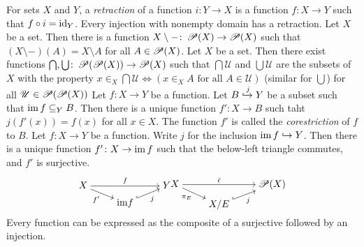  For sets $X$ and $Y$, a \textit{retraction} of a function $i \colon Y \to X$ is a function $f \colon X \to Y$ such that $f \circ i = \operatorname{id}_Y$.
 Every injection with nonempty domain has a retraction.
 Let $X$ be a set. Then there is a function $X \setminus - \colon \operatorname{\mathscr{P}}(X) \to \operatorname{\mathscr{P}}(X)$ such that $(X \setminus -) (A) = X \setminus A$ for all $A \in \operatorname{\mathscr{P}}(X)$.
 Let $X$ be a set. Then there exist functions $\bigcap, \bigcup \colon \operatorname{\mathscr{P}}(\operatorname{\mathscr{P}}(X)) \to \operatorname{\mathscr{P}}(X)$ such that $\bigcap \mathscr{U}$ and $\bigcup \mathscr{U}$ are the subsets of $X$ with the property $x \in_X \bigcap \mathscr{U} \iff (x \in_X A \text{ for all } A \in \mathscr{U})$ (similar for $\bigcup$) for all $\mathscr{U} \in \operatorname{\mathscr{P}}(\operatorname{\mathscr{P}}(X))$
 Let $f \colon X \to Y$ be a function. Let $B \xhookrightarrow{j} Y$ be a subset such that $\operatorname{im} f \subseteq_Y B$. Then there is a unique function $f' \colon X \to B$ such taht $j(f'(x)) = f(x)$ for all $x \in X$. The function $f'$ is called the \textit{corestriction} of $f$ to $B$.
 Let $f \colon X \to Y$ be a function. Write $j$ for the inclusion $\operatorname{im} f \hookrightarrow Y$. Then there is a unique function $f' \colon X \to \operatorname{im} f$ such that the below-left triangle commutes, and $f'$ is surjective.
\[\begin{tikzcd}[cramped,row sep=tiny]
    X && Y \\
    & {\text{im} f}
    \arrow["f", from=1-1, to=1-3]
    \arrow["{f'}"', from=1-1, to=2-2]
    \arrow["j"', hook, from=2-2, to=1-3]
\end{tikzcd}\begin{tikzcd}[cramped,row sep=tiny]
    X && {\mathscr{P}(X)} \\
    & {X/E}
    \arrow["{\bar{\epsilon}}", from=1-1, to=1-3]
    \arrow["{\pi_E}"', from=1-1, to=2-2]
    \arrow["j"', hook, from=2-2, to=1-3]
\end{tikzcd}\]
 Every function can be expressed as the composite of a surjective followed by an injection.